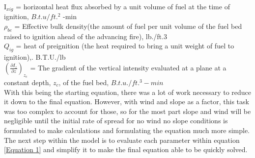 \documentclass{article}
\begin{document}
\noindent I$_{xig}$ = horizontal heat flux absorbed by a unit volume of fuel at the time of ignition, $B.t.u/ft.^2$ -min \\

\noindent $\rho_{be}$ = Effective bulk density(the amount of fuel per unit volume of the fuel bed raised to ignition ahead of the advancing fire), lb./ft.3 \\

\noindent $Q_{ig}$ = heat of preignition (the heat required to bring a unit weight of fuel to ignition),. B.T.U./lb \\

\noindent $(\frac {\partial {I_z}} {\partial z})_{z_c}$ = The gradient of the vertical intensity evaluated at a plane at a constant depth, $z_c$, of the fuel bed, $B.t.u./ft.^3 -min$ \\
\indent With this being the starting equation, there was a lot of work necessary to reduce it down to the final equation. However, with wind and slope as a factor, this task was too complex to account for those, so for the most part slope and wind will be negligible until the initial rate of spread for no wind no slope conditions is formulated to make calculations and formulating the equation much more simple. \\
\indent The next step within the model is to evaluate each parameter within equation \ref{Equation 1} and simplify it to make the final equation able to be quickly solved. \\
\end{document}
